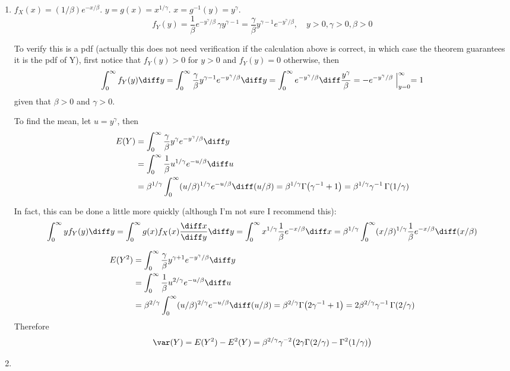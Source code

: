 \documentclass[12pt]{article}
\begin{document}
\begin{enumerate}
\begin{enumerate}
\item
$f_X(x) = (1/\beta) e^{-x/\beta}$.
$y = g(x) = x^{1/\gamma}$.
$x = g^{-1}(y) = y^{\gamma}$.
\[
f_Y(y)
= \frac{1}{\beta} e^{-y^{\gamma} / \beta} \, \gamma y^{\gamma-1}
= \frac{\gamma}{\beta} y^{\gamma-1} e^{-y^{\gamma} / \beta}
,\quad
y > 0, \gamma > 0, \beta > 0
\]

To verify this is a pdf
(actually this does not need verification if the calculation above is
correct, in which case the theorem guarantees it is the pdf of Y),
first notice that $f_Y(y) > 0$ for $y > 0$ and $f_Y(y) = 0$ otherwise,
then
\[
\int_0^{\infty} f_Y(y) \diff y
= \int_0^{\infty}
    \frac{\gamma}{\beta}
    y^{\gamma-1} e^{-y^{\gamma}/\beta} \diff y
= \int_0^{\infty}
    e^{-y^{\gamma}/\beta} \diff \frac{y^{\gamma}}{\beta}
= - e^{-y^{\gamma}/\beta} \Bigm|_{y=0}^{\infty}
= 1
\]
given that $\beta > 0$ and $\gamma > 0$.

To find the mean, let $u = y^{\gamma}$, then
\[\begin{split}
E(Y)
&= \int_0^{\infty} \frac{\gamma}{\beta} y^{\gamma} e^{-y^{\gamma}/\beta}
    \diff y
\\
&= \int_0^{\infty} \frac{1}{\beta} u^{1/\gamma} e^{-u/\beta} \diff u
\\
&= \beta^{1/\gamma} \int_0^{\infty} (u/\beta)^{1/\gamma} e^{-u/\beta}
    \diff (u/\beta)
= \beta^{1/\gamma} \Gamma\bigl(\gamma^{-1} + 1\bigr)
= \beta^{1/\gamma} \gamma^{-1} \,\Gamma(1/\gamma)
\end{split}
\]

In fact, this can be done a little more quickly (although I'm not sure
I recommend this):
\[
\int_0^{\infty} y f_Y(y) \diff y
= \int_0^{\infty} g(x) f_X(x)
    \frac{\diff x}{\diff y} \diff y
= \int_0^{\infty} x^{1/\gamma} \frac{1}{\beta} e^{-x/\beta} \diff x
= \beta^{1/\gamma} \int_0^{\infty} (x/\beta)^{1/\gamma} \frac{1}{\beta} e^{-x/\beta}
    \diff (x/\beta)
\]

\[\begin{split}
E(Y^2)
&= \int_0^{\infty} \frac{\gamma}{\beta} y^{\gamma+1} e^{-y^{\gamma}/\beta}
    \diff y
\\
&= \int_0^{\infty} \frac{1}{\beta} u^{2/\gamma} e^{-u/\beta} \diff u
\\
&= \beta^{2/\gamma}
    \int_0^{\infty} (u/\beta)^{2/\gamma} e^{-u/\beta} \diff (u/\beta)
= \beta^{2/\gamma} \Gamma\bigl(2\gamma^{-1} + 1\bigr)
= 2\beta^{2/\gamma} \gamma^{-1}\, \Gamma(2/\gamma)
\end{split}
\]
Therefore
\[
\var(Y)
= E(Y^2) - E^2(Y)
= \beta^{2/\gamma} \gamma^{-2} \bigl(
    2\gamma \Gamma(2/\gamma)
    - \Gamma^2(1/\gamma)
    \bigr)
\]
\item
\end{enumerate}

\end{enumerate}
\end{document}

